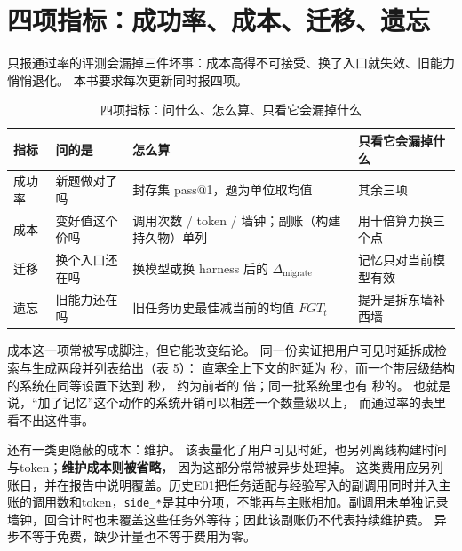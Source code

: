 \section{四项指标：成功率、成本、迁移、遗忘}
\label{sec:ch03-metrics}

\begin{sloppypar}
只报通过率的评测会漏掉三件坏事：成本高得不可接受、换了入口就失效、旧能力悄悄退化。
本书要求每次更新同时报四项。
\end{sloppypar}

\begin{table}[htbp]
\centering
\caption{四项指标：问什么、怎么算、只看它会漏掉什么}
\label{tab:ch03-metrics}
\begin{tabular}{>{\raggedright\arraybackslash}p{2.0cm}>{\raggedright\arraybackslash}p{4.2cm}>{\raggedright\arraybackslash}p{3.8cm}>{\raggedright\arraybackslash}p{3.4cm}}
\toprule
指标 & 问的是 & 怎么算 & 只看它会漏掉什么 \\
\midrule
成功率 & 新题做对了吗 & 封存集 pass@1，题为单位取均值 & 其余三项 \\
\midrule
成本 & 变好值这个价吗 & 调用次数 / token / 墙钟；副账（构建持久物）单列 & 用十倍算力换三个点 \\
\midrule
迁移 & 换个入口还在吗 & 换模型或换 harness 后的 $\Delta_{\text{migrate}}$ & 记忆只对当前模型有效 \\
\midrule
遗忘 & 旧能力还在吗 & 旧任务历史最佳减当前的均值 $FGT_t$ & 提升是拆东墙补西墙 \\
\bottomrule
\end{tabular}
\end{table}

\begin{sloppypar}
成本这一项常被写成脚注，但它能改变结论。
同一份实证\cite{anatomy-memory-2602}把用户可见时延拆成检索与生成两段并列表给出（表 5）：
直塞全上下文的时延为  秒，而一个带层级结构的系统在同等设置下达到  秒，
约为前者的  倍；同一批系统里也有  秒的。
也就是说，“加了记忆”这个动作的系统开销可以相差一个数量级以上，
而通过率的表里看不出这件事。
\end{sloppypar}

\begin{sloppypar}
还有一类更隐蔽的成本：维护。
该表量化了用户可见时延，也另列离线构建时间与token；\textbf{维护成本则被省略}，
因为这部分常常被异步处理掉。
这类费用应另列账目，并在报告中说明覆盖。历史E01把任务适配与经验写入的副调用同时并入主账的调用数和token，\texttt{side\_*}是其中分项，不能再与主账相加。副调用未单独记录墙钟，回合计时也未覆盖这些任务外等待；因此该副账仍不代表持续维护费。
异步不等于免费，缺少计量也不等于费用为零。
\end{sloppypar}

